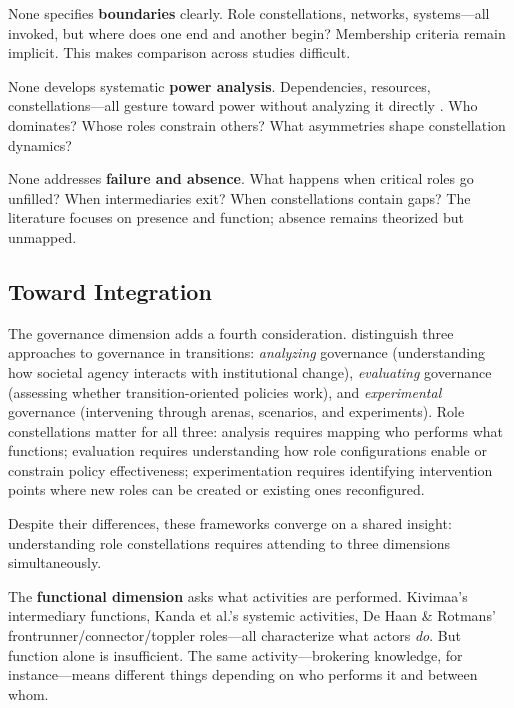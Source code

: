 \documentclass[../main.tex]{subfiles}
\begin{document}
None specifies \textbf{boundaries} clearly. Role constellations, networks, systems---all invoked, but where does one end and another begin? Membership criteria remain implicit. This makes comparison across studies difficult.

None develops systematic \textbf{power analysis}. Dependencies, resources, constellations---all gesture toward power without analyzing it directly \cite{avelino2024just}. Who dominates? Whose roles constrain others? What asymmetries shape constellation dynamics?

None addresses \textbf{failure and absence}. What happens when critical roles go unfilled? When intermediaries exit? When constellations contain gaps? The literature focuses on presence and function; absence remains theorized but unmapped.

\subsection{Toward Integration}

The governance dimension adds a fourth consideration. \textcite{loorbach2017transitions} distinguish three approaches to governance in transitions: \textit{analyzing} governance (understanding how societal agency interacts with institutional change), \textit{evaluating} governance (assessing whether transition-oriented policies work), and \textit{experimental} governance (intervening through arenas, scenarios, and experiments). Role constellations matter for all three: analysis requires mapping who performs what functions; evaluation requires understanding how role configurations enable or constrain policy effectiveness; experimentation requires identifying intervention points where new roles can be created or existing ones reconfigured.

Despite their differences, these frameworks converge on a shared insight: understanding role constellations requires attending to three dimensions simultaneously.

The \textbf{functional dimension} asks what activities are performed. Kivimaa's intermediary functions, Kanda et al.'s systemic activities, De Haan \& Rotmans' frontrunner/connector/toppler roles---all characterize what actors \emph{do}. But function alone is insufficient. The same activity---brokering knowledge, for instance---means different things depending on who performs it and between whom.
\end{document}

